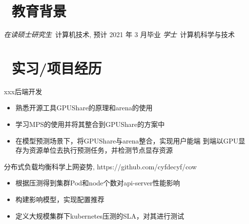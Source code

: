 \documentclass{resume}
\begin{document}


 
\section{\faGraduationCap\  教育背景}
\textit{在读硕士研究生}\ 计算机技术, 预计 2021 年 3 月毕业
\textit{学士}\ 计算机科学与技术

\section{\faUsers\ 实习/项目经历}
\role{开源}
xxx后端开发
\begin{itemize}
  \item 熟悉开源工具GPUShare的原理和arena的使用
  \item 学习MPS的使用并将其整合到GPUShare的方案中
  \item 在模型预测场景下，将GPUShare与arena整合，实现用户能端 到端以GPU显存为资源单位去执行预测任务，并检测节点显存资源
\end{itemize}

\begin{onehalfspacing}
分布式负载均衡科学上网姿势, https://github.com/cyfdecyf/cow
\begin{itemize}
  \item 根据压测得到集群Pod和node个数对api-server性能影响
  \item 构建影响模型，实现配置推荐
  \item 定义大规模集群下kubernetes压测的SLA，对其进行测试
\end{itemize}
\end{onehalfspacing}



\end{document}
